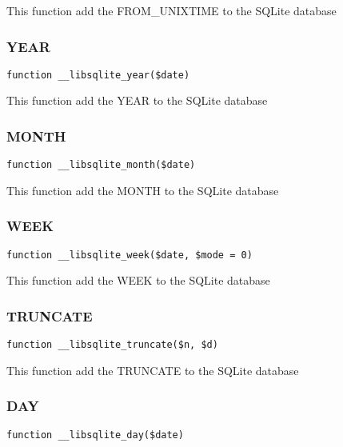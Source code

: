 \documentclass[a4paper]{article}
\begin{document}
This function add the FROM\_UNIXTIME to the SQLite database

\hypertarget{toc300}{}
\subsubsection{YEAR}

\begin{lstlisting}
function __libsqlite_year($date)
\end{lstlisting}

This function add the YEAR to the SQLite database

\hypertarget{toc301}{}
\subsubsection{MONTH}

\begin{lstlisting}
function __libsqlite_month($date)
\end{lstlisting}

This function add the MONTH to the SQLite database

\hypertarget{toc302}{}
\subsubsection{WEEK}

\begin{lstlisting}
function __libsqlite_week($date, $mode = 0)
\end{lstlisting}

This function add the WEEK to the SQLite database

\hypertarget{toc303}{}
\subsubsection{TRUNCATE}

\begin{lstlisting}
function __libsqlite_truncate($n, $d)
\end{lstlisting}

This function add the TRUNCATE to the SQLite database

\hypertarget{toc304}{}
\subsubsection{DAY}

\begin{lstlisting}
function __libsqlite_day($date)
\end{lstlisting}
\end{document}
